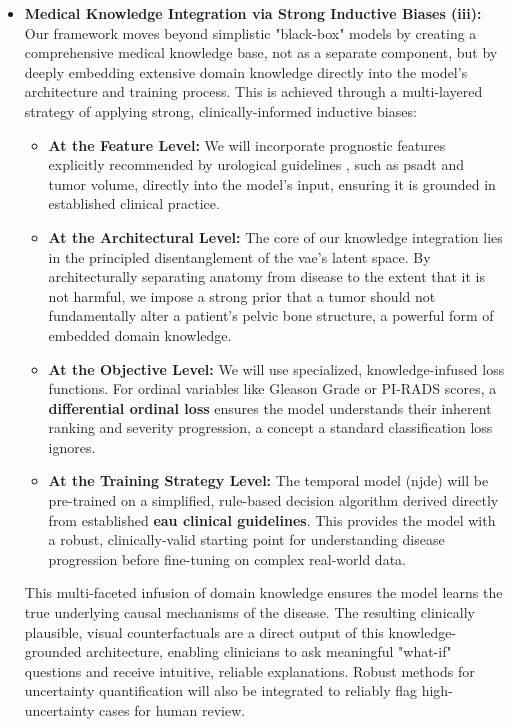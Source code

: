 \documentclass[11pt, a4paper]{article}
\begin{document}
\begin{itemize}
    \item \textbf{Medical Knowledge Integration via Strong Inductive Biases (iii):} Our framework moves beyond simplistic "black-box" models by creating a comprehensive medical knowledge base, not as a separate component, but by deeply embedding extensive domain knowledge directly into the model's architecture and training process. This is achieved through a multi-layered strategy of applying strong, clinically-informed inductive biases:
    \begin{itemize}
        \item \textbf{At the Feature Level:} We will incorporate prognostic features explicitly recommended by urological guidelines \cite{guidelines_uro_1,guidelines_uro_2} , such as \gls{psadt} and tumor volume, directly into the model's input, ensuring it is grounded in established clinical practice.
        \item \textbf{At the Architectural Level:} The core of our knowledge integration lies in the principled disentanglement of the \gls{vae}'s latent space. By architecturally separating anatomy from disease to the extent that it is not harmful, we impose a strong prior that a tumor should not fundamentally alter a patient's pelvic bone structure, a powerful form of embedded domain knowledge.
        \item \textbf{At the Objective Level:} We will use specialized, knowledge-infused loss functions. For ordinal variables like Gleason Grade or PI-RADS scores, a \textbf{differential ordinal loss} ensures the model understands their inherent ranking and severity progression, a concept a standard classification loss ignores.
        \item \textbf{At the Training Strategy Level:} The temporal model (\gls{njde}) will be pre-trained on a simplified, rule-based decision algorithm derived directly from established \textbf{\gls{eau} clinical guidelines}. This provides the model with a robust, clinically-valid starting point for understanding disease progression before fine-tuning on complex real-world data.
    \end{itemize}
    This multi-faceted infusion of domain knowledge ensures the model learns the true underlying causal mechanisms of the disease. The resulting clinically plausible, visual counterfactuals are a direct output of this knowledge-grounded architecture, enabling clinicians to ask meaningful "what-if" questions and receive intuitive, reliable explanations. Robust methods for uncertainty quantification will also be integrated to reliably flag high-uncertainty cases for human review.
\end{itemize}
\end{document}

